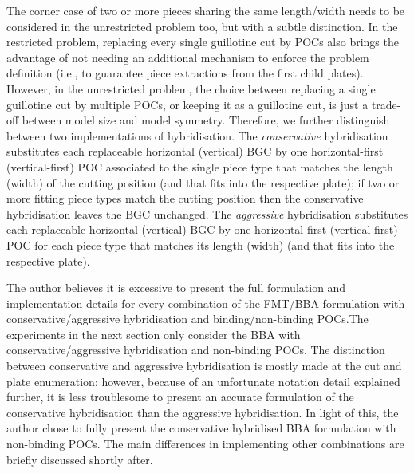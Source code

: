 \documentclass[ppgc,tese,english,formais,babel]{iiufrgs}
\begin{document}
The corner case of two or more pieces sharing the same length/width needs to be considered in the unrestricted problem too, but with a subtle distinction.
In the restricted problem, replacing every single guillotine cut by POCs also brings the advantage of not needing an additional mechanism to enforce the problem definition (i.e., to guarantee piece extractions from the first child plates).
However, in the unrestricted problem, the choice between replacing a single guillotine cut by multiple POCs, or keeping it as a guillotine cut, is just a trade-off between model size and model symmetry.
Therefore, we further distinguish between two implementations of hybridisation.
The \emph{conservative} hybridisation substitutes each replaceable horizontal (vertical) BGC by one horizontal-first (vertical-first) POC associated to the single piece type that matches the length (width) of the cutting position (and that fits into the respective plate); if two or more fitting piece types match the cutting position then the conservative hybridisation leaves the BGC unchanged.
The \emph{aggressive} hybridisation substitutes each replaceable horizontal (vertical) BGC by one horizontal-first (vertical-first) POC for each piece type that matches its length (width) (and that fits into the respective plate).

The author believes it is excessive to present the full formulation and implementation details for every combination of the FMT/BBA formulation with conservative/aggressive hybridisation and binding/non-binding POCs.The experiments in the next section only consider the BBA with conservative/aggressive hybridisation and non-binding POCs.
The distinction between conservative and aggressive hybridisation is mostly made at the cut and plate enumeration; however, because of an unfortunate notation detail explained further, it is less troublesome to present an accurate formulation of the conservative hybridisation than the aggressive hybridisation.
In light of this, the author chose to fully present the conservative hybridised BBA formulation with non-binding POCs.
The main differences in implementing other combinations are briefly discussed shortly after.
\end{document}
